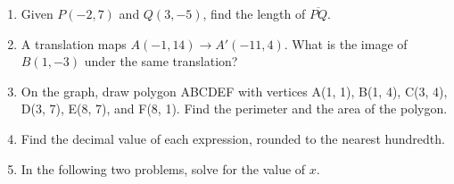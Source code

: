 \documentclass[12pt, twoside]{article}
\begin{document}
\begin{enumerate}
\newpage
\item Given $P(-2,7)$ and $Q(3,-5)$, find the length of $\overline{PQ}$.
      \vspace{4cm}

\item A translation maps $A(-1,14) \rightarrow A'(-11,4)$. What is the image of $B(1,-3)$ under the same translation?  \vspace{3cm}

\item On the graph, draw polygon ABCDEF with vertices A(1, 1), B(1, 4), C(3, 4), D(3, 7), E(8, 7), and F(8, 1). Find the perimeter and the area of the polygon.\\[1cm]
  \vspace{2cm}

\newpage
\item Find the decimal value of each expression, rounded to the nearest hundredth.
  \begin{enumerate}
  \end{enumerate}
  \vspace{0.5cm}

\item In the following two problems, solve for the value of $x$.
    \begin{enumerate}
    \end{enumerate}
    \vspace{4cm}


\end{enumerate}
\end{document}

